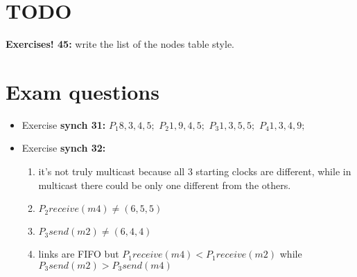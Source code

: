 \documentclass[11pt]{article}
\begin{document}
\section{TODO} %
\label{sec:todo}
\textbf{Exercises! 45:} write the list of the nodes table style.



\section{Exam questions} %
\label{sec:exam_questions}
\begin{itemize}
	\item Exercise \textbf{synch 31:} $P_1 8,3,4,5 ;$ $P_2 1,9,4,5 ;$ $P_3 1,3,5,5 ;$ $P_4 1,3,4,9;$
	\item Exercise \textbf{synch 32:} 
		\begin{enumerate}
			\item it's not truly multicast because all 3 starting clocks are different, while in multicast there could be only one different from the others.
			\item $P_2 receive(m4) \neq (6,5,5)$
			\item $P_3 send(m2) \neq (6,4,4)$
			\item links are FIFO but $P_1 receive(m4) < P_1 receive(m2)$ while $P_3 send(m2) > P_3 send(m4)$
		\end{enumerate}
\end{itemize}
\end{document}
